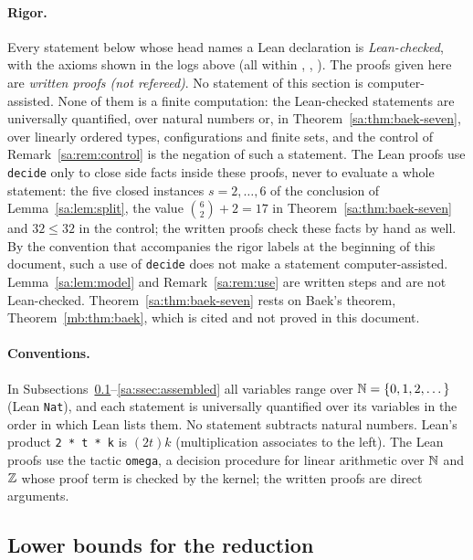 \paragraph{Rigor.}
Every statement below whose head names a Lean declaration is \emph{Lean-checked}, with the axioms shown in the logs
above (all within , , ). The proofs given here are
\emph{written proofs (not refereed)}. No statement of this section is computer-assisted. None of them is a finite
computation: the Lean-checked statements are universally quantified, over natural numbers or, in
Theorem~\ref{sa:thm:baek-seven}, over linearly ordered types, configurations and finite sets, and the control of
Remark~\ref{sa:rem:control} is the negation of such a statement. The Lean proofs use \texttt{decide} only to close
side facts inside these proofs, never to evaluate a whole statement: the five
closed instances $s=2,\dots,6$ of the conclusion of Lemma~\ref{sa:lem:split}, the value $\binom62+2=17$ in
Theorem~\ref{sa:thm:baek-seven} and $32\le32$ in the control; the written proofs check these facts by hand as well.
By the convention that accompanies the rigor labels at the beginning of this document, such a use of \texttt{decide}
does not make a statement computer-assisted.
Lemma~\ref{sa:lem:model} and Remark~\ref{sa:rem:use} are written steps and are not Lean-checked.
Theorem~\ref{sa:thm:baek-seven} rests on Baek's theorem, Theorem~\ref{mb:thm:baek}, which is cited and
not proved in this document.

\paragraph{Conventions.}
In Subsections~\ref{sa:ssec:lower}--\ref{sa:ssec:assembled} all variables range over $\mathbb N=\{0,1,2,\dots\}$ (Lean
\texttt{Nat}), and each statement is universally quantified over its variables in the order in which Lean lists
them. No statement subtracts natural numbers. Lean's product \mbox{\texttt{2 * t * k}} is $(2t)k$ (multiplication
associates to the left). The Lean proofs use the tactic \texttt{omega}, a decision procedure for linear arithmetic
over $\mathbb N$ and
$\mathbb Z$ whose proof term is checked by the kernel; the written proofs are direct arguments.

\subsection{Lower bounds for the reduction}\label{sa:ssec:lower}

